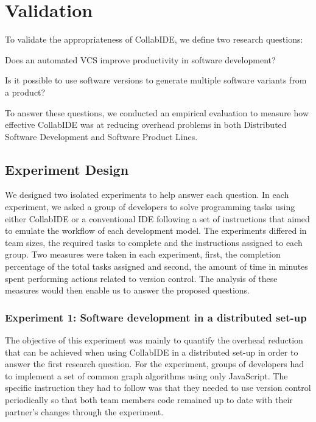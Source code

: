

\section{Validation}
\label{sec:validation}

To validate the appropriateness of CollabIDE, we define two research questions:
\begin{enumerate*}[label=(\arabic*)]
\item Does an automated \ac{VCS} improve productivity in software development?
\item Is it possible to use software versions to generate multiple software variants from a product?
\end{enumerate*} 
To answer these questions, we conducted an empirical evaluation 
to measure how effective CollabIDE was at reducing overhead problems 
in both Distributed Software Development and Software Product Lines.

\subsection{Experiment Design}

We designed two isolated experiments to help answer each question. In each experiment, we asked 
a group of developers to solve programming tasks using either CollabIDE or a 
conventional IDE following a set of instructions that aimed to emulate the workflow of each development model. The experiments differed in team sizes, the required tasks to complete and the instructions assigned to each group. Two measures were taken in each experiment, first, the completion percentage of the total tasks assigned and second, the amount of time in minutes spent performing actions related to version control. The analysis of these measures would then enable us to answer the proposed questions.

\subsubsection{Experiment 1: Software development in a distributed set-up}
The objective of this experiment was mainly to quantify the overhead reduction that can be achieved when using CollabIDE in a distributed set-up in order to answer the first research question. For the experiment, groups of developers had to implement a set of common graph algorithms using only JavaScript. The specific instruction they had to follow was that they needed to use version control periodically so that both team members code remained up to date with their partner's changes through the experiment. 



